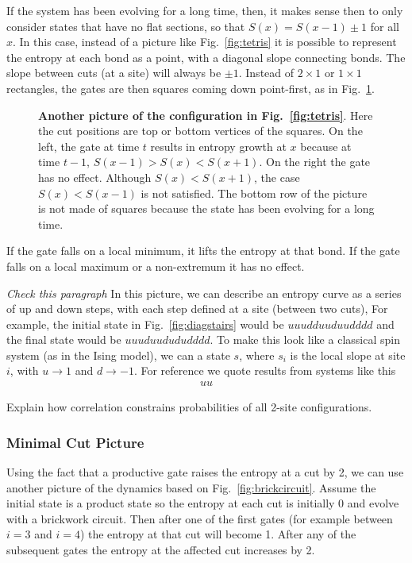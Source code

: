 If the system has been evolving for a long time, then, it makes sense then to only consider states that have no flat sections, so that $S(x) = S(x-1)\pm1$ for all $x$. In this case, instead of a picture like Fig.~\ref{fig:tetris} it is possible to represent the entropy at each bond as a point, with a diagonal slope connecting bonds. The slope between cuts (at a site) will always be $\pm1$. Instead of $2\times1$ or $1\times1$ rectangles, the gates are then squares coming down point-first, as in Fig.~\ref{fig:diaggate}. 
\begin{figure}
	\centering
	
	\caption{\textbf{Another picture of the configuration in Fig.~\ref{fig:tetris}}. Here the cut positions are top or bottom vertices of the squares. On the left, the gate at time $t$ results in entropy growth at $x$ because at time $t-1$, $S(x-1) > S(x) < S(x+1)$. On the right the gate has no effect. Although $S(x) < S(x+1)$, the case $S(x) < S(x-1)$ is not satisfied. The bottom row of the picture is not made of squares because the state has been evolving for a long time.}
	\label{fig:diaggate}
\end{figure}
If the gate falls on a local minimum, it lifts the entropy at that bond. If the gate falls on a local maximum or a non-extremum it has no effect.

\emph{Check this paragraph}
In this picture, we can describe an entropy curve as a series of up and down steps, with each step defined at a site (between two cuts), For example, the initial state in Fig.~\ref{fig:diagstairs} would be $uuudduuduudddd$ and the final state would be $uuuduudududddd$. To make this look like a classical spin system (as in the Ising model), we can a state $s$, where $s_i$ is the local slope at site $i$, with $u\to1$ and $d\to-1$. For reference we quote results from systems like this
\begin{align}
uu
\end{align}

Explain how correlation constrains probabilities of all 2-site configurations.

\subsubsection{Minimal Cut Picture} \label{subsub:mincut}

Using the fact that a productive gate raises the entropy at a cut by 2, we can use another picture of the dynamics based on Fig.~\ref{fig:brickcircuit}. Assume the initial state is a product state so the entropy at each cut is initially 0 and evolve with a brickwork circuit. Then after one of the first gates (for example between $i=3$ and $i=4$) the entropy at that cut will become 1. After any of the subsequent gates the entropy at the affected cut increases by 2.

